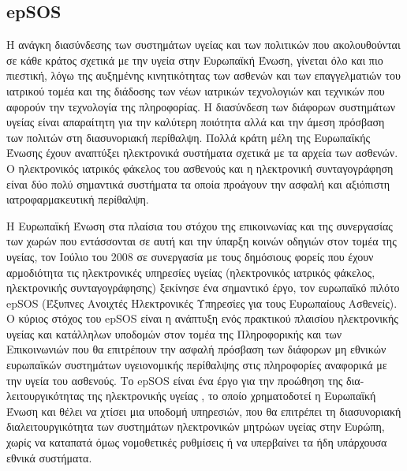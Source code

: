 	
	
	\subsection{epSOS}
	
		Η ανάγκη διασύνδεσης των συστημάτων υγείας και των πολιτικών που ακολουθούνται σε κάθε κράτος σχετικά με την υγεία στην Ευρωπαϊκή Ένωση, γίνεται όλο και πιο πιεστική, λόγω της αυξημένης κινητικότητας των ασθενών και των επαγγελματιών του ιατρικού τομέα και της διάδοσης των νέων ιατρικών τεχνολογιών και τεχνικών που αφορούν την τεχνολογία της πληροφορίας. Η διασύνδεση των διάφορων συστημάτων υγείας είναι απαραίτητη για την καλύτερη ποιότητα αλλά και την άμεση πρόσβαση των πολιτών στη διασυνοριακή περίθαλψη.  Πολλά κράτη μέλη της Ευρωπαϊκής Ένωσης έχουν αναπτύξει ηλεκτρονικά συστήματα σχετικά με τα αρχεία των ασθενών. Ο ηλεκτρονικός ιατρικός φάκελος του ασθενούς και η ηλεκτρονική συνταγογράφηση είναι δύο πολύ σημαντικά συστήματα τα οποία προάγουν την ασφαλή και αξιόπιστη ιατροφαρμακευτική περίθαλψη.	 	
	 	
	 	Η Ευρωπαϊκή Ένωση στα πλαίσια του στόχου της επικοινωνίας και της συνεργασίας των χωρών που εντάσσονται σε αυτή και την ύπαρξη κοινών οδηγιών στον τομέα της υγείας, τον Ιούλιο του 2008 σε συνεργασία με τους δημόσιους φορείς που έχουν αρμοδιότητα τις ηλεκτρονικές υπηρεσίες υγείας (ηλεκτρονικός ιατρικός φάκελος, ηλεκτρονικής συνταγογράφησης) ξεκίνησε ένα σημαντικό έργο, τον ευρωπαϊκό πιλότο epSOS (Έξυπνες Ανοιχτές Ηλεκτρονικές Υπηρεσίες για τους Ευρωπαίους Ασθενείς). Ο κύριος στόχος του epSOS είναι η ανάπτυξη ενός πρακτικού πλαισίου ηλεκτρονικής υγείας και κατάλληλων  υποδομών  στον τομέα της  Πληροφορικής και των Επικοινωνιών που θα επιτρέπουν την ασφαλή πρόσβαση των διάφορων μη εθνικών ευρωπαϊκών συστημάτων υγειονομικής περίθαλψης στις πληροφορίες αναφορικά με την υγεία του ασθενούς. Το epSOS είναι ένα έργο για την προώθηση της δια-λειτουργικότητας της ηλεκτρονικής υγείας , το οποίο χρηματοδοτεί η Ευρωπαϊκή Ένωση και θέλει να χτίσει μια υποδομή υπηρεσιών, που θα επιτρέπει  τη διασυνοριακή διαλειτουργικότητα των συστημάτων ηλεκτρονικών μητρώων υγείας στην Ευρώπη, χωρίς να καταπατά όμως νομοθετικές ρυθμίσεις ή να υπερβαίνει τα ήδη υπάρχουσα εθνικά συστήματα. \cite{Dogac2012}


